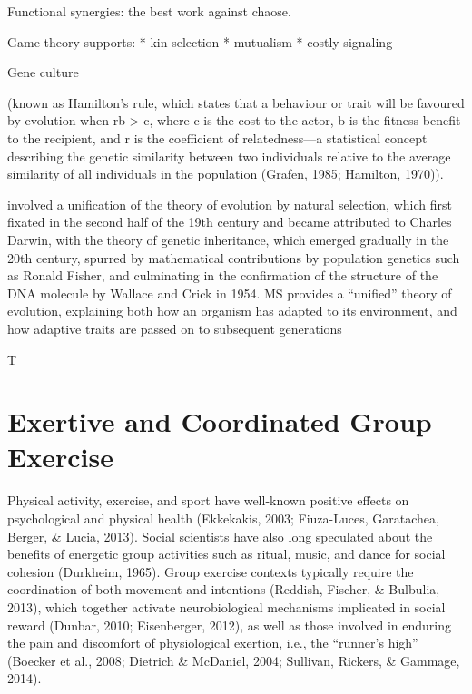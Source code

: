 Functional synergies: the best work against chaose.

Game theory supports:
* kin selection
* mutualism
* costly signaling


Gene culture

(known as Hamilton’s rule, which states that a behaviour or trait will be favoured by evolution when rb > c, where c is the cost to the actor, b is the fitness benefit to the recipient, and r is the coefficient of relatedness—a statistical concept describing the genetic similarity between two individuals relative to the average similarity of all individuals in the population (Grafen, 1985; Hamilton, 1970)).

involved a unification of the theory of evolution by natural selection, which first fixated in the second half of the 19th century and became attributed to Charles Darwin, with the theory of genetic inheritance, which emerged gradually in the 20th century, spurred by mathematical contributions by population genetics such as Ronald Fisher, and culminating in the confirmation of the structure of the DNA molecule by Wallace and Crick in 1954.  MS provides a ``unified'' theory of evolution, explaining both how an organism has adapted to its environment, and how adaptive traits are passed on to subsequent generations




T











\section{Exertive and Coordinated Group Exercise}
Physical activity, exercise, and sport have well-known positive effects on psychological and physical health (Ekkekakis, 2003; Fiuza-Luces, Garatachea, Berger, \& Lucia, 2013).
Social scientists have also long speculated about the benefits of energetic group activities such as ritual, music, and dance for social cohesion (Durkheim, 1965).  Group exercise contexts typically require the coordination of both movement and intentions (Reddish, Fischer, \& Bulbulia, 2013), which together activate neurobiological mechanisms implicated in social reward (Dunbar, 2010; Eisenberger, 2012), as well as those involved in enduring the pain and discomfort of physiological exertion, i.e., the ``runner’s high'' (Boecker et al., 2008; Dietrich \& McDaniel, 2004; Sullivan, Rickers, \& Gammage, 2014).


